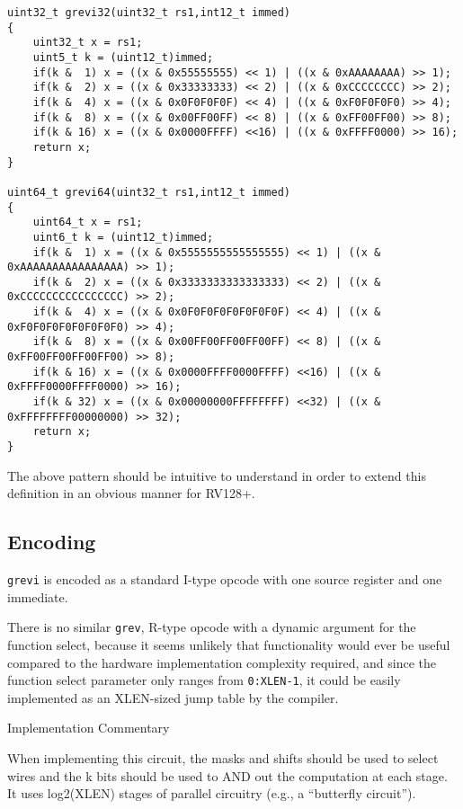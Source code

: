 \begin{verbatim}
uint32_t grevi32(uint32_t rs1,int12_t immed)
{
    uint32_t x = rs1;
    uint5_t k = (uint12_t)immed;
    if(k &  1) x = ((x & 0x55555555) << 1) | ((x & 0xAAAAAAAA) >> 1);
    if(k &  2) x = ((x & 0x33333333) << 2) | ((x & 0xCCCCCCCC) >> 2);
    if(k &  4) x = ((x & 0x0F0F0F0F) << 4) | ((x & 0xF0F0F0F0) >> 4);
    if(k &  8) x = ((x & 0x00FF00FF) << 8) | ((x & 0xFF00FF00) >> 8);
    if(k & 16) x = ((x & 0x0000FFFF) <<16) | ((x & 0xFFFF0000) >> 16);
    return x;
}

uint64_t grevi64(uint32_t rs1,int12_t immed)
{
    uint64_t x = rs1;
    uint6_t k = (uint12_t)immed;
    if(k &  1) x = ((x & 0x5555555555555555) << 1) | ((x & 0xAAAAAAAAAAAAAAAA) >> 1);
    if(k &  2) x = ((x & 0x3333333333333333) << 2) | ((x & 0xCCCCCCCCCCCCCCCC) >> 2);
    if(k &  4) x = ((x & 0x0F0F0F0F0F0F0F0F) << 4) | ((x & 0xF0F0F0F0F0F0F0F0) >> 4);
    if(k &  8) x = ((x & 0x00FF00FF00FF00FF) << 8) | ((x & 0xFF00FF00FF00FF00) >> 8);
    if(k & 16) x = ((x & 0x0000FFFF0000FFFF) <<16) | ((x & 0xFFFF0000FFFF0000) >> 16);
    if(k & 32) x = ((x & 0x00000000FFFFFFFF) <<32) | ((x & 0xFFFFFFFF00000000) >> 32);
    return x;
}
\end{verbatim}

The above pattern should be intuitive to understand in order to extend
this definition in an obvious manner for RV128+.

\subsection{Encoding}



\texttt{grevi} is encoded as a standard I-type opcode with one source
register and one immediate.

There is no similar \texttt{grev}, R-type opcode with a dynamic argument
for the function select, because it seems unlikely that functionality
would ever be useful compared to the hardware implementation complexity
required, and since the function select parameter only ranges from
\texttt{0:XLEN-1}, it could be easily implemented as an XLEN-sized jump
table by the compiler.

Implementation Commentary

When implementing this circuit, the masks and shifts should be used to
select wires and the k bits should be used to AND out the computation at
each stage. It uses log2(XLEN) stages of parallel circuitry (e.g., a
``butterfly circuit'').

